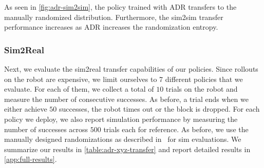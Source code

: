 As seen in \autoref{fig:adr-sim2sim}, the policy trained with ADR transfers to the manually randomized distribution. Furthermore, the sim2sim transfer performance increases as ADR increases the randomization entropy.

\subsubsection{Sim2Real}
Next, we evaluate the sim2real transfer capabilities of our policies. Since rollouts on the robot are expensive, we limit ourselves to 7 different policies that we evaluate. For each of them, we collect a total of $10$ trials on the robot and measure the number of consecutive successes. As before, a trial ends when we either achieve $50$ successes, the robot times out or the block is dropped. For each policy we deploy, we also report simulation performance by measuring the number of successes across $500$ trials each for reference. As before, we use the manually designed randomizations as described in~\cite{openai2018learning} for sim evaluations. We summarize our results in \autoref{table:adr-xyz-transfer} and report detailed results in \autoref{app:full-results}.

